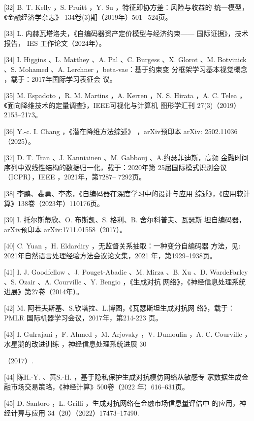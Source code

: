 \documentclass[UTF8]{ctexart}
\begin{document}
\begin{enumerate}
  {[}32{]} B. T. Kelly ，S. Pruitt ，Y. Su ，特征即协方差：风险与收益的
  统一模型，《金融经济学杂志》 134卷(3)期（2019年）501-- 524页。

  {[}33{]} L. 内赫瓦塔洛夫，《自编码器资产定价模型与经济约束------
  国际证据》，技术报告， IES 工作论文（2024年）。

  {[}34{]} I. Higgins 、L. Matthey 、A. Pal 、C. Burgess 、X. Glorot
  、M. Botvinick 、S. Mohamed 、A. Lerchner ，beta-vae：基于约束变
  分框架学习基本视觉概念 ，载于：2017年国际学习表征会 议。

  {[}35{]} M. Espadoto ，R. M. Martins ，A. Kerren ，N. S. Hirata ，A.
  C. Telea ，《面向降维技术的定量调查》，IEEE可视化与计算机 图形学汇刊
  27(3)（2019）2153--2173。

  {[}36{]} Y.-c. I. Chang ，《潜在降维方法综述》 ，arXiv预印本 arXiv:
  2502.11036（2025）。

  {[}37{]} D. T. Tran 、J. Kanniainen 、M. Gabbouj 、A.约瑟菲迪斯，高频
  金融时间序列中双线性结构的数据归一化，载于：2020年第
  25届国际模式识别会议（ICPR），IEEE ，2021年，第7287-- 7292页。

  {[}38{]} 李鹏、裴勇、李杰，《自编码器在深度学习中的设计与应用
  综述》，《应用软计算》138卷（2023年）110176页。

  {[}39{]} I. 托尔斯蒂欣、O. 布斯凯、S. 格利、B. 舍尔科普夫、瓦瑟斯
  坦自编码器，arXiv预印本 arXiv:1711.01558（2017）。

  {[}40{]} C. Yuan ，H. Eldardiry ，无监督关系抽取：一种变分自编码器
  方法，见: 2021年自然语言处理经验方法会议论文集，2021
  年，第1929--1938页。

  {[}41{]} I. J. Goodfellow 、J. Pouget-Abadie 、M. Mirza 、B. Xu 、D.
  WardeFarley 、S. Ozair 、A. Courville 、Y. Bengio ，《生成对抗
  网络》，《神经信息处理系统进展》第27卷（2014年）。

  {[}42{]} M. 阿若夫斯基、S.钦塔拉、L.博图，《瓦瑟斯坦生成对抗网
  络》，载于： PMLR 国际机器学习会议，2017年，第214-223 页。

  {[}43{]} I. Gulrajani ，F. Ahmed ，M. Arjovsky ，V. Dumoulin ，A. C.
  Courville ，水星鹅的改进训练 ，神经信息处理系统进展 30

  （2017）.

  {[}44{]} 陈H.-Y. 、黄S.-H. ，基于隐私保护生成对抗模仿网络从敏感专
  家数据生成金融市场交易策略，《神经计算》500卷（2022 年）616--631页。

  {[}45{]} D. Santoro ，L. Grilli ，生成对抗网络在金融市场信息量评估中
  的应用，神经计算与应用 34（20）（2022）17473--17490.


\end{enumerate}
\end{document}
